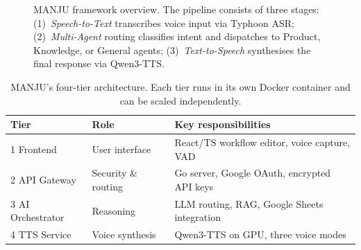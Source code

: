 \documentclass[10pt, a4paper, twocolumn]{article}
\begin{document}
\begin{figure}[t]
    \caption{MANJU framework overview. The pipeline consists of three stages:
    (1)~\textit{Speech-to-Text} transcribes voice input via Typhoon ASR;
    (2)~\textit{Multi-Agent} routing classifies intent and dispatches to
    Product, Knowledge, or General agents;
    (3)~\textit{Text-to-Speech} synthesises the final response via Qwen3-TTS.}
    \label{fig:methodology}
\end{figure}

\begin{table}[b]
    \centering
    \caption{MANJU's four-tier architecture. Each tier runs in its own
             Docker container and can be scaled independently.}
    \label{tab:tiers}
    \small
    \begin{tabular}{@{}lll@{}}
        \toprule
        \textbf{Tier} & \textbf{Role} & \textbf{Key responsibilities} \\
        \midrule
        1 Frontend      & User interface     & React/TS workflow editor, voice capture, VAD \\
        2 API Gateway   & Security \& routing & Go server, Google OAuth, encrypted API keys \\
        3 AI Orchestrator & Reasoning        & LLM routing, RAG, Google Sheets integration \\
        4 TTS Service   & Voice synthesis    & Qwen3-TTS on GPU, three voice modes \\
        \bottomrule
    \end{tabular}
\end{table}
\end{document}
